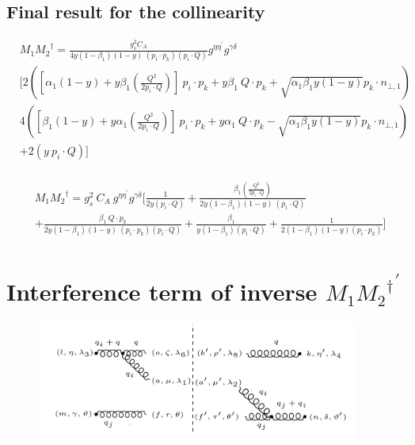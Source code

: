 \subsection*{Final result for the collinearity}
\begin{equation}
\begin{split}
&M_1{M_2}^{\dagger}=\frac{g_s^2 C_A}{4y(1-\beta_1) (1-y)\:(p_i \cdot p_k)(p_i \cdot Q)}
g^{{{\eta}}{{\eta}^{\prime}}}g^{{{\gamma}}{{\delta}}} \\
&[2([\alpha_1 (1-y)+y\beta_1(\frac{Q^2}{2p_i \cdot Q})]\:p_i \cdot p_k+y\beta_1\:Q\cdot p_k+\sqrt{\alpha_1\beta_1y(1-y)} p_k \cdot {n_{\bot,1}})\\
&4([\beta_1 (1-y)+y\alpha_1(\frac{Q^2}{2p_i \cdot Q})]\:p_i \cdot p_k+y\alpha_1\:Q\cdot p_k-\sqrt{\alpha_1\beta_1y(1-y)} p_k \cdot {n_{\bot,1}})\\
&+2(y\:p_i\cdot Q)]\\
\end{split}
\end{equation}

\begin{equation}
\begin{split}
&M_1{M_2}^{\dagger}=g_s^2\: C_A\:g^{{{\eta}}{{\eta}^{\prime}}}g^{{{\gamma}}{{\delta}}}[\frac{1}{2y(p_i \cdot Q)}+\frac{\beta_1(\frac{Q^2}{2p_i \cdot Q})}{2y(1-\beta_1) (1-y)\:(p_i \cdot Q)}\\
&+\frac{\beta_1\:Q\cdot p_k}{2y(1-\beta_1) (1-y)\:(p_i \cdot p_k)(p_i \cdot Q)}+\frac{\beta_1}{y(1-\beta_1) (p_i \cdot Q)}+\frac{1}{2(1-\beta_1)(1-y) (p_i \cdot p_k)}]\\
\end{split}
\end{equation}



\pagebreak

\section{Interference term of inverse ${M_1{M_2}^{\dagger}}^{\prime}$}
\begin{figure}[h!]
\centering
\includegraphics[width=0.95\textwidth]{images/GG/M1DaggerggInverse.png}
\end{figure}


